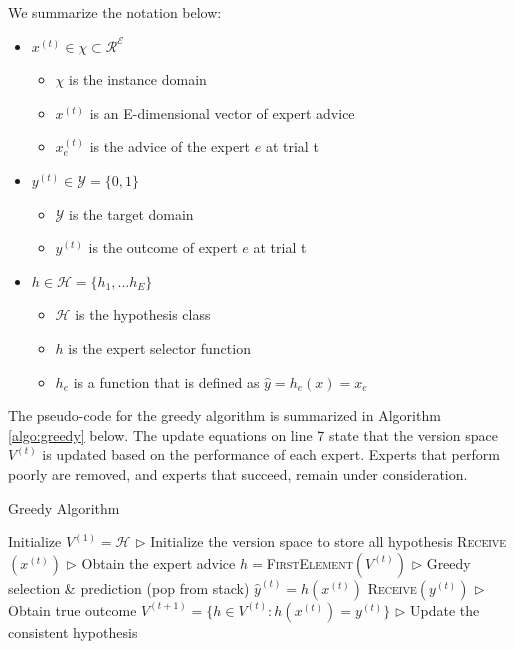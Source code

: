 \documentclass[11pt]{article}
\begin{document}
We summarize the notation below:
\begin{itemize}
    \item $x^{(t)} \in \chi \subset \mathcal{R^E}$
    \begin{itemize}
      \item $\chi$ is the instance domain
      \item $x^{(t)}$ is an E-dimensional vector of expert advice
      \item $x_e^{(t)}$ is the advice of the expert $e$ at trial t
    \end{itemize}
    \item $y^{(t)} \in \mathcal{Y} =\{0,1\}$
    \begin{itemize}
      \item $\mathcal{Y}$ is the target domain
      \item $y^{(t)}$ is the outcome of expert $e$ at trial t
    \end{itemize}
    \item $h \in \mathcal{H} =\{h_1,...h_E\}$
    \begin{itemize}
      \item $\mathcal{H}$ is the hypothesis class
      \item $h$ is the expert selector function
      \item $h_e$ is a function that is defined as $\hat{y} = h_e(x)=x_e$
    \end{itemize}
\end{itemize}

The pseudo-code for the greedy algorithm is summarized in Algorithm \ref{algo:greedy} below. The update equations on line 7 state that the version space $V^{(t)}$ is updated based on the performance of each expert. Experts that perform poorly are removed, and experts that succeed, remain under consideration.

\begin{algorithm}[H]
\caption{Greedy Algorithm}
\label{algo:greedy}
\begin{algorithmic}[1]
\STATE Initialize $V^{(1)} = \mathcal{H}$ \hfill $\triangleright$ Initialize the version space to store all hypothesis
    \STATE \textsc{Receive}$(x^{(t)})$ \hfill $\triangleright$ Obtain the expert advice
    \STATE $h=$\textsc{FirstElement}$(V^{(t)})$  \hfill $\triangleright$ Greedy selection \& prediction (pop from stack)
    \STATE $\hat{y}^{(t)}=h(x^{(t)})$
    \STATE \textsc{Receive}$(y^{(t)})$ \hfill $\triangleright$ Obtain true outcome
    \STATE $V^{(t+1)}=\{h \in V^{(t)} : h(x^{(t)})= y^{(t)}\}$  \hfill $\triangleright$ Update the consistent hypothesis
\ENDFOR

\end{algorithmic}
\end{algorithm}
\end{document}
